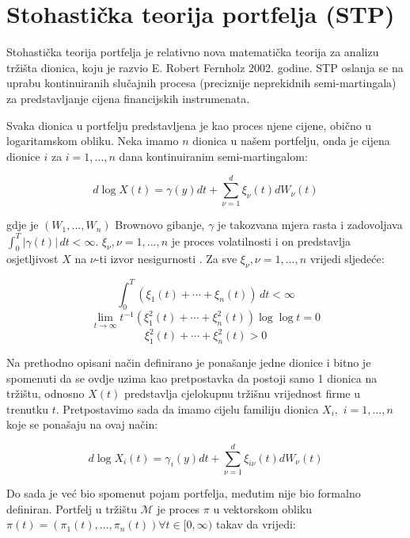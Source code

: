 \documentclass[times, utf8, seminar]{fer}
\begin{document}

\chapter{Stohastička teorija portfelja (STP)}
Stohastička teorija portfelja je relativno nova matematička teorija za analizu tržišta dionica, koju je razvio E. Robert Fernholz 2002. godine. STP oslanja se na uprabu kontinuiranih slučajnih procesa (preciznije neprekidnih semi-martingala) za predstavljanje cijena financijskih instrumenata.

Svaka dionica u portfelju predstavljena je kao proces njene cijene, obično u logaritamskom obliku. Neka imamo $n$ dionica u našem portfelju, onda je cijena dionice $i$ za $i=1,...,n$ dana kontinuiranim semi-martingalom:

\[ d \log X(t) = \gamma(y)dt + \sum_{\nu=1}^{d}\xi_{\nu}(t)dW_{\nu}(t) \]

gdje je $(W_1,...,W_n)$ Brownovo gibanje, $\gamma$ je takozvana mjera rasta  i zadovoljava \(\int_{0}^{T} |\gamma(t)| \,dt < \infty\). \(\xi_{\nu}, \nu = 1,...,n\) je proces volatilnosti  i on predstavlja osjetljivost \(X\) na \(\nu\)-ti izvor nesigurnosti .
Za sve \(\xi_{\nu}, \nu = 1,...,n\) vrijedi sljedeće:

\[ \int_{0}^{T} (\xi_1(t) + \cdots + \xi_n(t)) \,dt < \infty\]
\[ \lim_{t\to\infty} t^{-1}(\xi_1^2(t) + \cdots + \xi_n^2(t))\log\log t = 0 \]
\[ \xi_1^2(t) + \cdots + \xi_n^2(t) > 0 \]

Na prethodno opisani način definirano je ponašanje jedne dionice i bitno je spomenuti da se ovdje uzima kao pretpostavka da postoji samo 1 dionica na tržištu, odnosno \(X(t)\) predstavlja cjelokupnu tržišnu vrijednost firme u trenutku $t$.
Pretpostavimo sada da imamo cijelu familiju dionica \(X_i,\) \(i = 1,...,n\) koje  se ponašaju na ovaj način:

\[ d \log X_i(t) = \gamma_i(y)dt + \sum_{\nu=1}^{d}\xi_{i\nu}(t)dW_{\nu}(t) \]

Do sada je već bio spomenut pojam portfelja, međutim nije bio formalno definiran. Portfelj u tržištu $\mathcal{M}$ je proces $\pi$ u vektorskom obliku \( \pi(t) = (\pi_1(t),...,\pi_n(t)) \forall t\in [0,\infty) \) takav da vrijedi:
\end{document}
